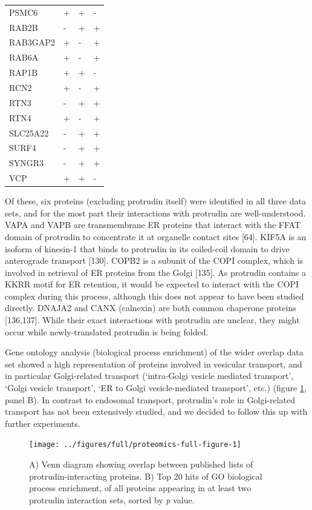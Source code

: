 \documentclass[
  12pt,
  a4paper,
]{book}
\begin{document}
\begin{longtable}[]{@{}llll@{}}
PSMC6 & + & + & - \\
RAB2B & - & + & + \\
RAB3GAP2 & + & - & + \\
RAB6A & + & - & + \\
RAP1B & + & + & - \\
RCN2 & + & - & + \\
RTN3 & - & + & + \\
RTN4 & + & - & + \\
SLC25A22 & - & + & + \\
SURF4 & - & + & + \\
SYNGR3 & - & + & + \\
VCP & + & + & - \\
\end{longtable}

Of these, six proteins (excluding protrudin itself) were identified in all three data sets, and for the most part their interactions with protrudin are well-understood. VAPA and VAPB are transmembrane ER proteins that interact with the FFAT domain of protrudin to concentrate it at organelle contact sites {[}64{]}. KIF5A is an isoform of kinesin-1 that binds to protrudin in its coiled-coil domain to drive anterograde transport {[}130{]}. COPB2 is a subunit of the COPI complex, which is involved in retrieval of ER proteins from the Golgi {[}135{]}. As protrudin contains a KKRR motif for ER retention, it would be expected to interact with the COPI complex during this process, although this does not appear to have been studied directly. DNAJA2 and CANX (calnexin) are both common chaperone proteins {[}136,137{]}. While their exact interactions with protrudin are unclear, they might occur while newly-translated protrudin is being folded.

Gene ontology analysis (biological process enrichment) of the wider overlap data set showed a high representation of proteins involved in vesicular transport, and in particular Golgi-related transport (`intra-Golgi vesicle mediated transport', `Golgi vesicle transport', `ER to Golgi vesicle-mediated transport', etc.) (figure \ref{fig:proteomics-full-figure}, panel B). In contrast to endosomal transport, protrudin's role in Golgi-related transport has not been extensively studied, and we decided to follow this up with further experiments.



\begin{figure}
\texttt{[image: ../figures/full/proteomics-full-figure-1]} \caption[Data set comparison and gene ontology of conserved protrudin-interacting proteins]{A) Venn diagram showing overlap between published lists of protrudin-interacting proteins. B) Top 20 hits of GO biological process enrichment, of all proteins appearing in at least two protrudin interaction sets, sorted by \emph{p} value.}\label{fig:proteomics-full-figure}
\end{figure}
\end{document}

